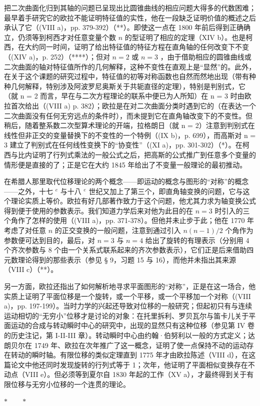 把二次曲面化归到其轴的问题已呈现出比圆锥曲线的相应问题大得多的代数困难；最早着手研究它的欧拉不能证明特征值的实性，他在一段缺乏证明价值的概述之后承认了它（(VIII a)，pp. 379-392）（**）。即使这一点在 1800 年前后得到正确确立，仍须等到柯西才对任意变量个数 \(n\) 的型证明了相应的定理（XIV b）。也是柯西，在大约同一时间，证明了给出特征值的特征方程在直角轴的任何改变下不变（(XIV a)，p. 252）（****）；但对 \(n = 2\) 或 \(n = 3\) ，由于借助相应的圆锥曲线或二次曲面的轴对特征值所作的几何解释，这种不变性在直观上是“显然”的。此外，在关于这个课题的研究过程中，特征值的初等对称函数也自然而然地出现（带有种种几何解释，特别涉及阿波罗尼奥斯关于共轭直径的定理），特别是判别式，它（就 n = 2 而言，早在与二次方程理论的联系中便已为人所知）在 n = 3 时由欧拉首次给出（(VIII a) p. 382）；欧拉是在对二次曲面分类时遇到它的（在表达一个二次曲面没有任何无穷远点的条件时），而未提到它在直角轴改变下的不变性。但稍后，随着整系数二次型算术理论的开端，拉格朗日（就 n = 2）注意到判别式在线性但非正交的变量替换下的不变性的一个特例（(IX b)，p. 699），而高斯对 n = 3 建立了判别式在任何线性变换下的“协变性”（(XI a)，pp. 301-302）（*）。在柯西与比内证明了行列式乘法的一般公式之后，把高斯的公式推广到任意多个变量的情形便是直接的了；正是它在大约 1845 年给出了不变量一般理论的最初推动。

在希腊人那里取代位移理论的两个概念——即运动的概念与图形的“对称”的概念——之外，十七 \(^{e}\) 与十八 \(^{e}\) 世纪又加上了第三个，即直角轴变换的问题，它与这个理论实质上等价。欧拉有好几部著作致力于这个问题，他尤其力求为轴变换公式得到便于使用的参数表示。我们知道力学后来对他为此目的在 \(n = 3\) 时引入的三个角作了怎样的使用（(VIII a)，pp. 371-378）。但他并未止步于此；他在 1770 年考虑了对任意 \(n\) 的正交变换的一般问题，注意到通过引入 \(n(n - 1)/2\) 个角作为参数便可达到目的，最后，对 \(n = 3\) 与 \(n = 4\) 给出了旋转的有理表示（分别用 4 个齐次参数与 8 个由一个关系式联系起来的齐次参数表示），它们正是后来借助四元数理论得到的那些表示（参见 § 9，习题 15 与 16），而他并未指出其来源（VIII c）（**）。

另一方面，欧拉还指出了如何解析地寻求平面图形的“对称”，正是在这一场合，他实质上证明了平面位移是一个旋转，或一个平移，或一个平移加一个对称（(VIII a)，pp. 197-199）。当时力学的兴起还导致对位移的一般研究；但起初只有与连续运动相切的“无穷小”位移才是讨论的对象：在托里拆利、罗贝瓦尔与笛卡儿关于平面运动的合成与转动瞬时中心的研究中，出现的显然只有这种位移（参见第 IV 卷的历史注记，第 I-II-III 章）。转动瞬时中心由约翰·伯努利以一般的方式定义；达朗贝尔在 1749 年、欧拉在次年推广了这一概念，证明了使一点保持不动的运动存在转动的瞬时轴。有限位移的类似定理直到 1775 年才由欧拉陈述（VIII d），在这篇论文中他还同时发现旋转的行列式等于 1；次年，他证明了平面相似变换存在不动点（VIII e）。但必须等到夏尔自 1830 年起的工作（XV a），才最终得到关于有限位移与无穷小位移的一个连贯的理论。
\relax{}
\begin{center}
\(\ast\qquad\ast\)
\end{center}

